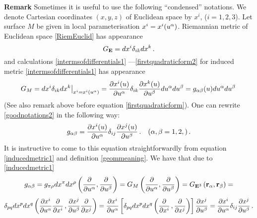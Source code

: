\documentclass[12pt]{article}
\theoremstyle{theorem}
\numberwithin{equation}{section}
\begin{document}
{\bf Remark}  Sometimes it is useful to use 
the following ``condensed'' notations.
We denote Cartesian coordinates $(x,y,z)$ 
of Euclidean space
by $x^i$, ($i=1,2,3$).   Let surface $M$ 
be given in local  parameterisation $x^i=x^i(u^\alpha)$.
Riemannian metric of Euclidean space \eqref{RiemEuclid} 
has appearance
                  \begin{equation}
           \label{goodnotations1}
                   G_{\bf E}=dx^i\delta_{ik}dx^k\,.
                    \end{equation}
and calculations
\eqref{intermsofdifferentials1}
---\eqref{firstquadraticform2}
 for 
induced metric \eqref{intermsofdifferentials1} 
           has appearance
                  \begin{equation}
\label{goodnotations2}
                 G_M=
    dx^i\delta_{ik}dx^k\big\vert_{x^i=x^i(u^\alpha)}=
                 {\partial x^i(u)\over \partial u^\alpha}
                 \delta_{ik}
                 {\partial x^k(u)\over \partial u^\beta}
                 du^\alpha du^\beta=g_{\alpha\beta}(u)du^\alpha du^\beta\,
                    \end{equation}
(See also remark above before 
equation \eqref{firstquadraticform}).
One can rewrite \eqref{goodnotations2} in the following way:
              \begin{equation*}\label{inducedmetric4}
              g_{\alpha\beta}=
      {\partial x^i(u)\over \partial u^\alpha}
             \delta_{ij}
      {\partial x^j(u)\over \partial u^\beta}\,.
         \quad (\alpha,\beta=1,2,)\,.
              \end{equation*}
It is instructive to come to this equation
 straightforwardly 
from equation \eqref{inducedmetric1}
and definition \eqref{geommeaning}.
We have that due to \eqref{inducedmetric1}
                   $$
   g_{\alpha\beta}=
g_{\pi\rho}dx^\pi dx^\rho
                     \left(
{\partial\over \partial u^\alpha},{\partial\over \partial u^\beta}
                \right)=
G_M         
                 \left(
{\partial\over \partial u^\alpha},{\partial\over \partial u^\beta}
                \right)=
G_{{\bf E}^3}         
                 \left(
{\bf r}_\alpha,{\bf r}_\beta
                \right)=
                  $$
         \begin{equation*}
\delta_{pq}dx^pdx^q
        \left(
   {\partial x^i\over \partial u^\alpha}{\partial \over \partial x^i}\,,
   {\partial x^j\over \partial u^\beta}{\partial \over \partial x^j}
         \right)=
{\partial x^i\over \partial u^\alpha}
          \left[
   \delta_{pq}dx^pdx^q
            \left(
   {\partial \over \partial x^i}\,,
   {\partial \over \partial x^j}
         \right)
            \right]
{\partial x^j\over \partial u^\beta}
          =
      {\partial x^i\over \partial u^\alpha}
   \delta_{ij}
{\partial x^j\over \partial u^\beta}\,.
                    \end{equation*} 
\end{document}
